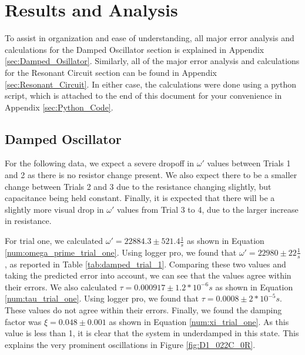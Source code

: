 \documentclass[12pt]{article}
\begin{document}
\section{Results and Analysis}
To assist in organization and ease of understanding, all major error analysis and calculations for the Damped Oscillator section is explained in Appendix \ref{sec:Damped_Osillator}. Similarly, all of the major error analysis and calculations for the Resonant Circuit section can be found in Appendix \ref{sec:Resonant_Circuit}. In either case, the calculations were done using a python script, which is attached to the end of this document for your convenience in Appendix \ref{sec:Python_Code}.

\subsection{Damped Oscillator}
For the following data, we expect a severe dropoff in $\omega'$ values between Trials 1 and 2 as there is no resistor change present. We also expect there to be a smaller change between Trials 2 and 3 due to the resistance changing slightly, but capacitance being held constant. Finally, it is expected that there will be a slightly more visual drop in $\omega'$ values from Trial 3 to 4, due to the larger increase in resistance.

For trial one, we calculated $\omega'=22884.3\pm521.4\frac{1}{s}$ as shown in Equation \ref{num:omega_prime_trial_one}. Using logger pro, we found that $\omega'=22980\pm22\frac{1}{s}$, as reported in Table \ref{tab:damped_trial_1}. Comparing these two values and taking the predicted error into account, we can see that the values agree within their errors. We also calculated $\tau=0.000917\pm1.2*10^{-6} s$ as shown in Equation \ref{num:tau_trial_one}. Using logger pro, we found that $\tau=0.0008\pm2*10^{-5} s$. These values do not agree within their errors. Finally, we found the damping factor was $\xi=0.048\pm0.001$ as shown in Equation \ref{num:xi_trial_one}. As this value is less than 1, it is clear that the system in underdamped in this state. This explains the very prominent oscillations in Figure \ref{fig:D1_022C_0R}.
\end{document}
